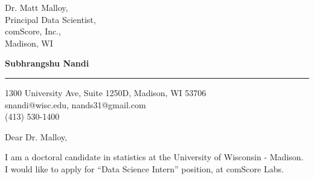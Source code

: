 \documentclass{letter} %
\begin{document}
\signature{Subhrangshu Nandi}           %
\longindentation=0pt                       %
\let\raggedleft\raggedright                %
 
 
\begin{letter}
{Dr. Matt Malloy, \\
Principal Data Scientist,\\
comScore, Inc.,\\
Madison, WI}

\begin{flushleft}
{\bf Subhrangshu Nandi}
\end{flushleft}
\medskip\hrule height 1pt
\begin{flushright}
\hfill 1300 University Ave, Suite 1250D, Madison, WI 53706 \\
\hfill snandi@wisc.edu, nands31@gmail.com\\
\hfill (413) 530-1400
\end{flushright} 
\vfill %

\opening{Dear Dr. Malloy,} 
 
\noindent %
I am a doctoral candidate in statistics at the University of Wisconsin - Madison. I would like to apply for ``Data Science Intern'' position, at comScore Labs.
 

\end{letter}
\end{document}
